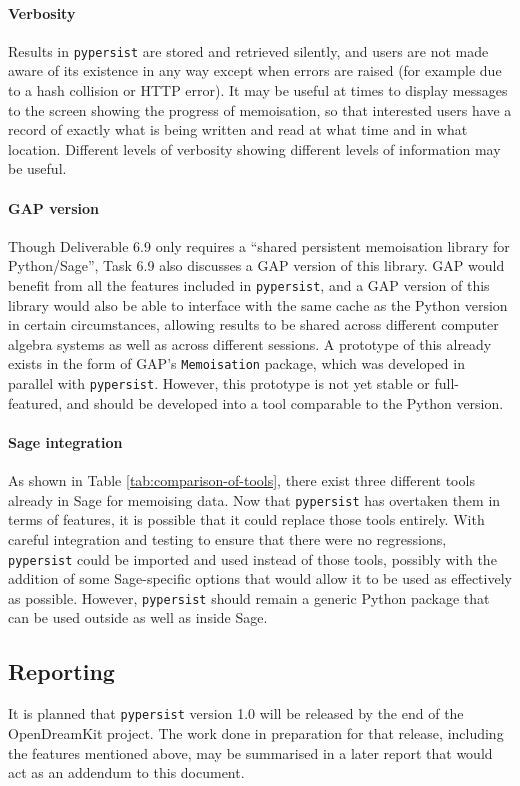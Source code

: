 \documentclass{deliverablereport}
\newcommand{\pypersist}{\texttt{pypersist}}
\begin{document}
\paragraph{Verbosity}
Results in \pypersist{} are stored and retrieved silently, and users are not
made aware of its existence in any way except when errors are raised (for
example due to a hash collision or HTTP error).  It may be useful at times to
display messages to the screen showing the progress of memoisation, so that
interested users have a record of exactly what is being written and read at what
time and in what location.  Different levels of verbosity showing different
levels of information may be useful.

\paragraph{GAP version}
Though Deliverable 6.9 only requires a ``shared persistent memoisation library
for Python/Sage'', Task 6.9 also discusses a GAP version of this library.  GAP
would benefit from all the features included in \pypersist{}, and a GAP version
of this library would also be able to interface with the same cache as the
Python version in certain circumstances, allowing results to be shared across
different computer algebra systems as well as across different sessions.  A
prototype of this already exists in the form of GAP's \texttt{Memoisation}
package, which was developed in parallel with \pypersist{}.  However, this
prototype is not yet stable or full-featured, and should be developed into a
tool comparable to the Python version.

\paragraph{Sage integration}
As shown in Table \ref{tab:comparison-of-tools}, there exist three different
tools already in Sage for memoising data.  Now that \pypersist{} has overtaken
them in terms of features, it is possible that it could replace those tools
entirely.  With careful integration and testing to ensure that there were no
regressions, \pypersist{} could be imported and used instead of those tools,
possibly with the addition of some Sage-specific options that would allow it to
be used as effectively as possible.  However, \pypersist{} should remain a
generic Python package that can be used outside as well as inside Sage.

\subsection{Reporting}
It is planned that \pypersist{} version 1.0 will be released by the end of the
OpenDreamKit project.  The work done in preparation for that release, including
the features mentioned above, may be summarised in a later report that would act
as an addendum to this document.
\end{document}
